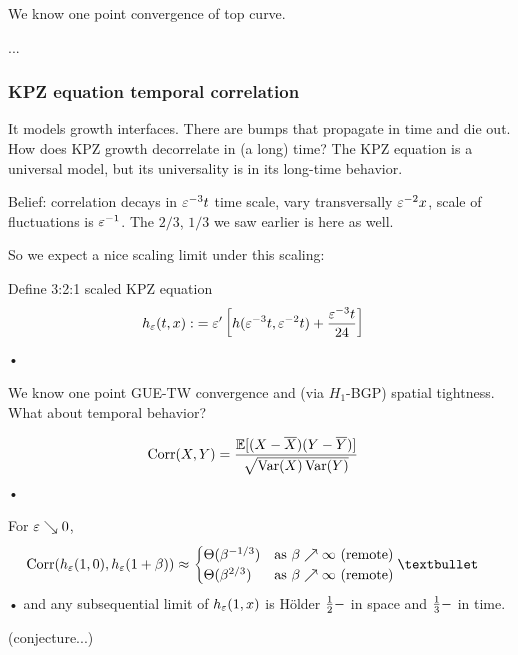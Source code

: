 We know one point convergence of top curve.
\begin{thm}
...%
\end{thm}
\subsubsection{KPZ equation temporal correlation}


It models growth interfaces. There are bumps that propagate in time and die out. How does KPZ growth decorrelate in (a long) time? 
The KPZ equation is a universal model, but its universality is in its long-time behavior.

Belief: correlation decays in $\varepsilon^{-3}t$ time scale, vary transversally $\varepsilon^{-2}x$, scale of fluctuations is $\varepsilon^{-1}$. The $2/3$, $1/3$ we saw earlier is here as well.

So we expect a nice scaling limit under this scaling:
\begin{df}
Define 3:2:1 scaled KPZ equation
\begin{align*}
h_\varepsilon(t,x):&= \varepsilon'\left[ {h(\varepsilon^{-3}t,\varepsilon^{-2}t)+\frac{\varepsilon^{-3}t}{24}} \right]
\end{align*}•
\end{df}
We know one point GUE-TW convergence and (via $H_1$-BGP) spatial tightness. What about temporal behavior?


\begin{align*}
\operatorname{Corr}(X,Y) &= \frac{\mathbb{E}[(X-\overline{X})(Y-\overline{Y})]}{\sqrt{\operatorname{Var}(X)\operatorname{Var}(Y)}}
\end{align*}•
\begin{thm}
For $\varepsilon\searrow 0$, 
\begin{align*}
\Corr(h_\ep(1,0),h_\ep(1+\be)) &\approx
\begin{cases}
\Te(\be^{-1/3})&\text{as }\be\nearrow \iy\text{ (remote)}\\
\Te(\be^{2/3})&\text{as }\be\nearrow \iy\text{ (remote)}\\
\end{cases}•
\end{align*}•
and any subsequential limit of $h_\varepsilon(1,x)$ is H\"older $\frac{1}{2}-$ in space and $\frac{1}{3}-$ in time. 
\end{thm}
(conjecture...)

